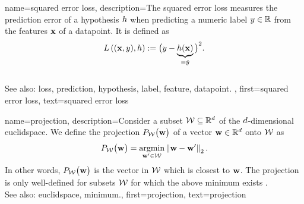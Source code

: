 {name={squared error loss},
description={The squared 
		error \gls{loss} measures the \gls{prediction} error of a 
		\gls{hypothesis} $h$ when predicting a numeric \gls{label} $y \in \mathbb{R}$ 
		from the \glspl{feature} ${\bf x}$ of a \gls{datapoint}. It is 
	defined as 
\begin{equation} 
	\nonumber
	L\left(({\bf x},y),h \right) := \big(y - \underbrace{h({\bf x})}_{=\hat{y}} \big)^{2}. 
\end{equation} 
			\\ 
		See also: \gls{loss}, \gls{prediction}, \gls{hypothesis}, \gls{label}, \gls{feature}, \gls{datapoint}.
},
first={squared error loss},
text={squared error loss}
}


 {name={projection}, 
       description={Consider a subset $\mathcal{W} \subseteq \mathbb{R}^{d}$ of 
	   the $d$-dimensional \gls{euclidspace}. We define the projection $P_{\mathcal{W}}\big( {\bf w}\big)$
	   of a vector ${\bf w} \in \mathbb{R}^{d}$ onto $\mathcal{W}$ as
		\begin{equation} 
   	    \label{equ_def_proj_generic_dict}
  	     P_{\mathcal{W}}\big( {\bf w}\big) = \operatorname*{argmin}_{{\bf w}' \in \mathcal{W}} \left\Vert {{\bf w}- {\bf w}'} \right\Vert_{2}. 
         \end{equation}
		 In other words, $P_{\mathcal{W}}\big( {\bf w}\big)$ is the vector in $\mathcal{W}$ 
		 which is closest to ${\bf w}$. The projection is only well-defined for subsets $\mathcal{W}$ 
		 for which the above \gls{minimum} exists \cite{BoydConvexBook}.
		 			\\ 
		See also: \gls{euclidspace}, \gls{minimum}.},
		 first={projection},
		 text={projection}
}


